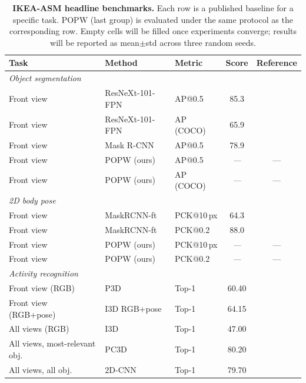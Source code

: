 \documentclass[11pt,a4paper]{article}
\newcommand{\popw}{POPW}
\newcommand{\ikea}{IKEA-ASM}
\newcommand{\todo}{\textit{---}}              %
\newcommand{\popwres}{\todo}                  %
\begin{document}
\begin{table}[!htbp]
\centering
\small
\caption{\textbf{\ikea{} headline benchmarks.} Each row is a published baseline for a specific task.
\popw{} (last group) is evaluated under the same protocol as the corresponding row.
Empty cells will be filled once experiments converge; results will be reported as
mean$\pm$std across three random seeds.}
\label{tab:ikea-headline}
\renewcommand{\arraystretch}{1.15}
\begin{tabular}{l l l c c}
\toprule
\textbf{Task} & \textbf{Method} & \textbf{Metric} & \textbf{Score} & \textbf{Reference} \\
\midrule
\multicolumn{5}{l}{\textit{Object segmentation}} \\
Front view & ResNeXt-101-FPN  & AP@0.5         & 85.3 & \cite{benshabat2021ikea} \\
Front view & ResNeXt-101-FPN  & AP (COCO)      & 65.9 & \cite{benshabat2021ikea} \\
Front view & Mask R-CNN       & AP@0.5         & 78.9 & \cite{benshabat2021ikea} \\
Front view & \popw{} (ours)   & AP@0.5         & \popwres & --- \\
Front view & \popw{} (ours)   & AP (COCO)      & \popwres & --- \\
\midrule
\multicolumn{5}{l}{\textit{2D body pose}} \\
Front view & MaskRCNN-ft      & PCK@10\,px     & 64.3 & \cite{benshabat2021ikea} \\
Front view & MaskRCNN-ft      & PCK@0.2        & 88.0 & \cite{benshabat2021ikea} \\
Front view & \popw{} (ours)   & PCK@10\,px     & \popwres & --- \\
Front view & \popw{} (ours)   & PCK@0.2        & \popwres & --- \\
\midrule
\multicolumn{5}{l}{\textit{Activity recognition}} \\
Front view (RGB)        & P3D                  & Top-1   & 60.40 & \cite{benshabat2021ikea} \\
Front view (RGB+pose)   & I3D RGB+pose         & Top-1   & 64.15 & \cite{benshabat2021ikea} \\
All views (RGB)         & I3D                  & Top-1   & 47.00 & \cite{benshabat2021ikea} \\
All views, most-relevant obj. & PC3D~\cite{aganian2023ikea}     & Top-1 & 80.20 & \cite{aganian2023ikea} \\
All views, all obj.     & 2D-CNN~\cite{aganian2023ikea}        & Top-1 & 79.70 & \cite{aganian2023ikea} \\

\end{tabular}
\end{table}
\end{document}
